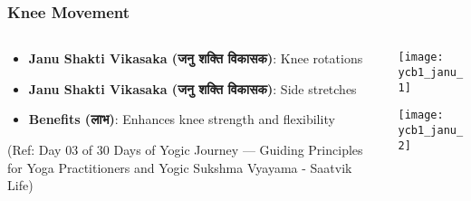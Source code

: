 \begin{frame}[fragile]\frametitle{Knee Movement}
\begin{columns}
    \begin{column}[T]{0.5\linewidth}
      \begin{itemize}
		\item \textbf{Janu Shakti Vikasaka (जनु शक्ति विकासक)}: Knee rotations
		\item \textbf{Janu Shakti Vikasaka (जनु शक्ति विकासक)}: Side stretches
		\item \textbf{Benefits (लाभ)}: Enhances knee strength and flexibility
	  \end{itemize}
	  
	  		{\tiny (Ref: Day 03 of 30 Days of Yogic Journey — Guiding Principles for Yoga Practitioners and Yogic Sukshma Vyayama - Saatvik Life)}	
    \end{column}
    \begin{column}[T]{0.5\linewidth}
		\begin{center}
		\texttt{[image: ycb1\_janu\_1]}
		
		\texttt{[image: ycb1\_janu\_2]}

		\end{center}	
    \end{column}
\end{columns}
\end{frame}

